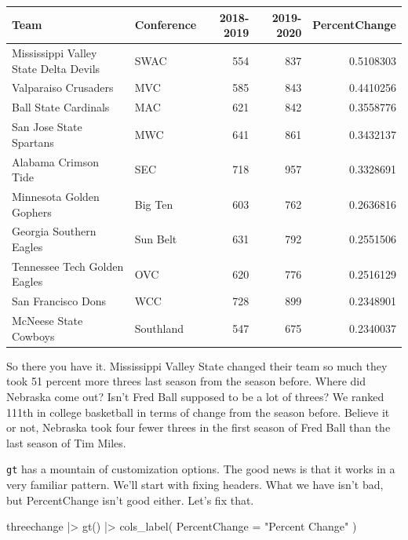 \documentclass[
  letterpaper,
  DIV=11,
  numbers=noendperiod]{scrreprt}
\newenvironment{Shaded}{\begin{snugshade}}{\end{snugshade}}
\newcommand{\AttributeTok}[1]{\textcolor[rgb]{0.40,0.45,0.13}{#1}}
\newcommand{\FunctionTok}[1]{\textcolor[rgb]{0.28,0.35,0.67}{#1}}
\newcommand{\NormalTok}[1]{\textcolor[rgb]{0.00,0.23,0.31}{#1}}
\newcommand{\SpecialCharTok}[1]{\textcolor[rgb]{0.37,0.37,0.37}{#1}}
\newcommand{\StringTok}[1]{\textcolor[rgb]{0.13,0.47,0.30}{#1}}
\begin{document}
\begin{longtable}{llrrr}
\toprule
Team & Conference & 2018-2019 & 2019-2020 & PercentChange \\ 
\midrule\addlinespace[2.5pt]
Mississippi Valley State Delta Devils & SWAC & 554 & 837 & 0.5108303 \\ 
Valparaiso Crusaders & MVC & 585 & 843 & 0.4410256 \\ 
Ball State Cardinals & MAC & 621 & 842 & 0.3558776 \\ 
San Jose State Spartans & MWC & 641 & 861 & 0.3432137 \\ 
Alabama Crimson Tide & SEC & 718 & 957 & 0.3328691 \\ 
Minnesota Golden Gophers & Big Ten & 603 & 762 & 0.2636816 \\ 
Georgia Southern Eagles & Sun Belt & 631 & 792 & 0.2551506 \\ 
Tennessee Tech Golden Eagles & OVC & 620 & 776 & 0.2516129 \\ 
San Francisco Dons & WCC & 728 & 899 & 0.2348901 \\ 
McNeese State Cowboys & Southland & 547 & 675 & 0.2340037 \\ 
\bottomrule
\end{longtable}

So there you have it. Mississippi Valley State changed their team so
much they took 51 percent more threes last season from the season
before. Where did Nebraska come out? Isn't Fred Ball supposed to be a
lot of threes? We ranked 111th in college basketball in terms of change
from the season before. Believe it or not, Nebraska took four fewer
threes in the first season of Fred Ball than the last season of Tim
Miles.

\texttt{gt} has a mountain of customization options. The good news is
that it works in a very familiar pattern. We'll start with fixing
headers. What we have isn't bad, but PercentChange isn't good either.
Let's fix that.

\begin{Shaded}
\begin{Highlighting}[]
\NormalTok{threechange }\SpecialCharTok{|\textgreater{}} 
  \FunctionTok{gt}\NormalTok{() }\SpecialCharTok{|\textgreater{}} 
  \FunctionTok{cols\_label}\NormalTok{(}
    \AttributeTok{PercentChange =} \StringTok{"Percent Change"}
\NormalTok{  )}
\end{Highlighting}
\end{Shaded}
\end{document}
